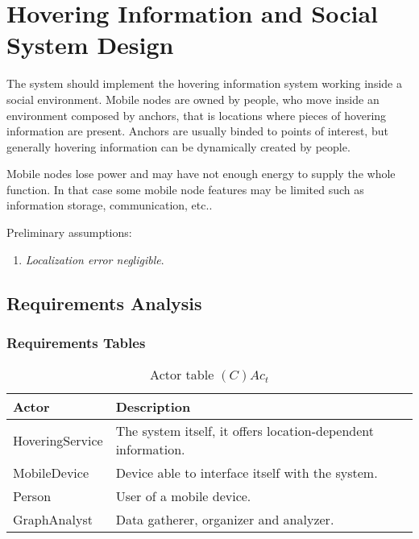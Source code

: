 \section{Hovering Information and Social System Design}
\label{sec:design}

The system should implement the hovering information system working inside
a social environment. Mobile nodes are owned by people, who move inside an
environment composed by anchors, that is locations where pieces of hovering
information are present. Anchors are usually binded to points of interest, but
generally hovering information can be dynamically created by people.

Mobile nodes lose power and may have not enough energy to supply the whole
function.  In that case some mobile node features may be limited such as
information storage, communication, etc..

Preliminary assumptions:
\begin{enumerate}
	\item \emph{Localization error negligible}.
\end{enumerate}

\subsection{Requirements Analysis}

\subsubsection*{Requirements Tables}

\begin{table}[H]
	\centering
	\begin{tabular}{|p{4cm}|p{8cm}|}
			\hline
			\textbf{Actor} & \textbf{Description} \\
			\hline
			HoveringService & The system itself, it offers location-dependent information. \\
			\hline
			MobileDevice & Device able to interface itself with the system. \\
			\hline
			Person & User of a mobile device. \\
			\hline
			GraphAnalyst & Data gatherer, organizer and analyzer. \\
			\hline
		\end{tabular}
	\caption{Actor table $(C)Ac_t$}
	\label{tab:cact}
\end{table}

